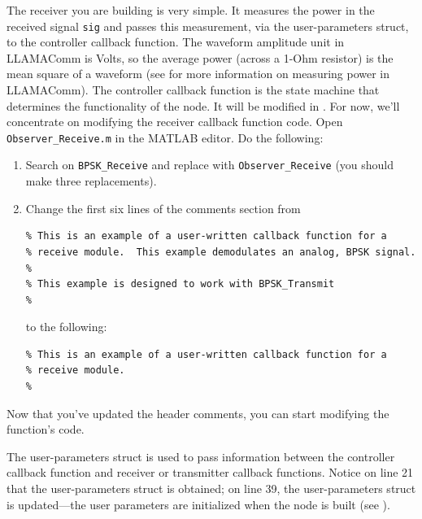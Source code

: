The receiver you are building is very simple. It measures the power in the received signal \verb+sig+ and passes this measurement, via the user-parameters struct, to the controller callback function.  The waveform amplitude unit in LLAMAComm is Volts, so the average power (across a 1-Ohm resistor) is the mean square of a waveform (see  for more information on measuring power in LLAMAComm).  The controller callback function is the state machine that determines the functionality of the node.  It will be modified in .  For now, we'll concentrate on modifying the receiver callback function code.
Open \verb+Observer_Receive.m+ in the MATLAB editor.  Do the following:
\begin{enumerate}
\item Search on \verb+BPSK_Receive+ and replace with \verb+Observer_Receive+ (you should make three replacements).

\item Change the first six lines of the comments section from
\begin{lstlisting}[numbers=none]
% Function Observer_Receive.m:
% This is an example of a user-written callback function for a
% receive module.  This example demodulates an analog, BPSK signal.
%
% This example is designed to work with BPSK_Transmit
%
\end{lstlisting}
%
to the following:
%
\begin{lstlisting}[numbers=none]
% Function Observer_Receive.m:
% This is an example of a user-written callback function for a
% receive module.
%
\end{lstlisting}
%
\end{enumerate}
Now that you've updated the header comments, you can start modifying the function's code.

The user-parameters struct is used to pass information between the controller callback function and receiver or transmitter callback functions.  Notice on line 21 that the user-parameters struct is obtained; on line 39, the user-parameters struct is updated---the user parameters are initialized when the node is built (see ).


